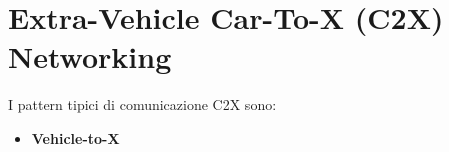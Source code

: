 \section{Extra-Vehicle Car-To-X (C2X) Networking}

I pattern tipici di comunicazione C2X sono:
\begin{itemize}
    \item \textbf{Vehicle-to-X}
\end{itemize}


